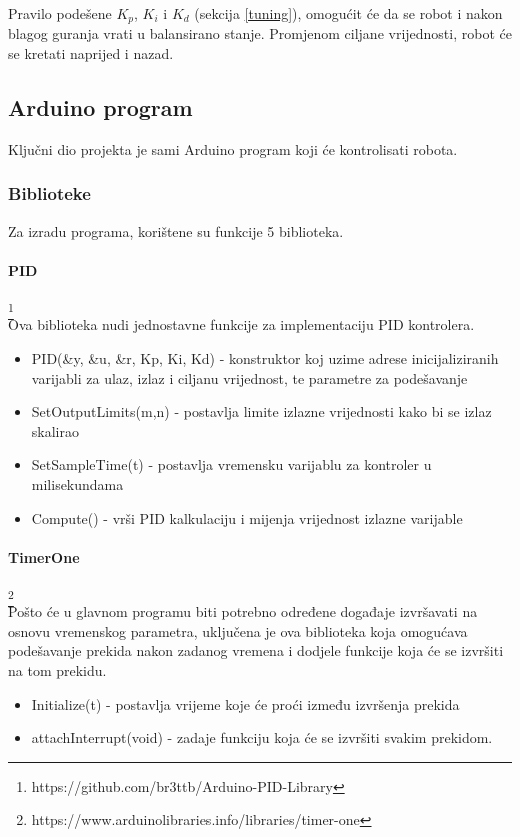 \documentclass[../Document.tex]{subfiles}
\begin{document}

\noindent Pravilo podešene $K_p$, $K_i$ i $K_d$ (sekcija \ref{tuning}), omogućit će da se robot i nakon blagog guranja vrati u balansirano stanje. Promjenom ciljane vrijednosti, robot će se kretati naprijed i nazad.

\subsection{Arduino program}
Ključni dio projekta je sami Arduino program koji će kontrolisati robota.

\subsubsection{Biblioteke}
Za izradu programa, korištene su funkcije 5 biblioteka.

\paragraph{PID}\footnote{https://github.com/br3ttb/Arduino-PID-Library}\mbox{}\\
\noindent Ova biblioteka nudi jednostavne funkcije za implementaciju PID kontrolera.
\begin{itemize}
    \item PID(\&y, \&u, \&r, Kp, Ki, Kd) - konstruktor koj uzime adrese inicijaliziranih varijabli za ulaz, izlaz i ciljanu vrijednost, te parametre za podešavanje
    \item SetOutputLimits(m,n) - postavlja limite izlazne vrijednosti kako bi se izlaz skalirao
    \item SetSampleTime(t) - postavlja vremensku varijablu za kontroler u milisekundama
    \item Compute() - vrši PID kalkulaciju i mijenja vrijednost izlazne varijable
\end{itemize}

\paragraph{TimerOne}\footnote{https://www.arduinolibraries.info/libraries/timer-one}\mbox{}\\
\noindent Pošto će u glavnom programu biti potrebno određene događaje izvršavati na osnovu vremenskog parametra, uključena je ova biblioteka koja omogućava podešavanje prekida nakon zadanog vremena i dodjele funkcije koja će se izvršiti na tom prekidu.
\begin{itemize}
    \item Initialize(t) - postavlja vrijeme koje će proći između izvršenja prekida
    \item attachInterrupt(void) - zadaje funkciju koja će se izvršiti svakim prekidom.
\end{itemize}
\end{document}
